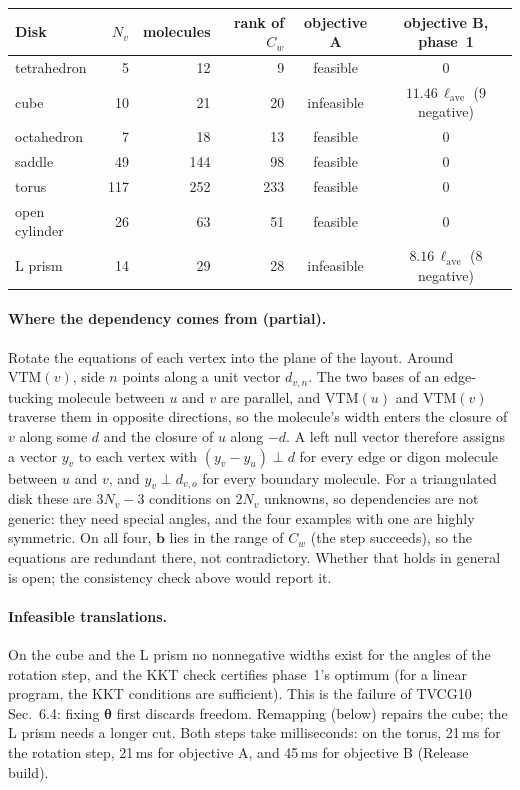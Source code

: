 \documentclass[11pt]{article}
\newcommand{\VTM}{\mathrm{VTM}}
\theoremstyle{definition}
\begin{document}
\begin{center}
\small
\begin{tabular}{@{}lrrrcc@{}}
\toprule
Disk & $N_v$ & molecules & rank of $C_w$ & objective A & objective B, phase~1 \\
\midrule
tetrahedron & 5 & 12 & 9 & feasible & 0 \\
cube & 10 & 21 & 20 & infeasible & $11.46\,\ell_{\mathrm{ave}}$ (9 negative) \\
octahedron & 7 & 18 & 13 & feasible & 0 \\
saddle & 49 & 144 & 98 & feasible & 0 \\
torus & 117 & 252 & 233 & feasible & 0 \\
open cylinder & 26 & 63 & 51 & feasible & 0 \\
L prism & 14 & 29 & 28 & infeasible & $8.16\,\ell_{\mathrm{ave}}$ (8 negative) \\
\bottomrule
\end{tabular}
\end{center}

\paragraph{Where the dependency comes from (partial).} Rotate the equations of
each vertex into the plane of the layout. Around $\VTM(v)$, side $n$ points
along a unit vector $d_{v,n}$. The two bases of an edge-tucking molecule
between $u$ and $v$ are parallel, and $\VTM(u)$ and $\VTM(v)$ traverse them in
opposite directions, so the molecule's width enters the closure of $v$ along
some $d$ and the closure of $u$ along $-d$. A left null vector therefore
assigns a vector $y_v$ to each vertex with $(y_v - y_u)\perp d$ for every edge
or digon molecule between $u$ and $v$, and $y_v \perp d_{v,o}$ for every
boundary molecule. For a triangulated disk these
are $3N_v - 3$ conditions on $2N_v$ unknowns, so dependencies are not generic:
they need special angles, and the four examples with one are highly
symmetric. On all four, $\mathbf b$ lies in the range of $C_w$ (the step
succeeds), so the equations are redundant there, not contradictory. Whether
that holds in general is open; the consistency check above would report it.

\paragraph{Infeasible translations.} On the cube and the L prism no
nonnegative widths exist for the angles of the rotation step, and the KKT
check certifies phase~1's optimum (for a linear program, the KKT conditions
are sufficient). This is the failure of TVCG10 Sec.~6.4: fixing
$\boldsymbol\theta$ first discards freedom. Remapping (below) repairs the
cube; the L prism needs a longer cut. Both steps take milliseconds: on the
torus, 21\,ms for the rotation step, 21\,ms for objective A, and 45\,ms for
objective B (Release build).
\end{document}
